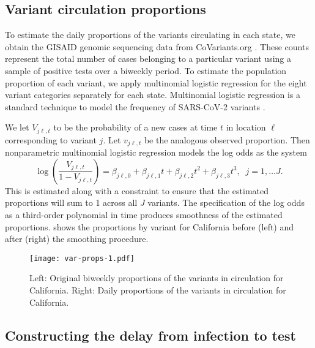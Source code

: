 \subsection{Variant circulation proportions}
\label{sec:variant-proportions}


To estimate the daily proportions of the variants circulating in each state, we
obtain the GISAID genomic sequencing data from CoVariants.org
\citep{hodcroft2021covariants, elbe2017data}. These counts represent the total
number of cases belonging to a particular variant using
a sample of positive tests over a biweekly period. To estimate the population
proportion of each variant, we apply multinomial logistic regression 
for the eight variant categories separately for each state. 
Multinomial logistic regression is a standard technique to model the
frequency of SARS-CoV-2 variants 
\citep{obermeyer2022analysis, annavajhala2021emergence, figgins2021sars}.

We let $V_{j\ell,t}$ to be the probability of a new cases at time $t$ in location
$\ell$ corresponding to variant $j$. Let $v_{j\ell,t}$ be the analogous observed
proportion. Then nonparametric multinomial logistic regression models the log odds
as the system
\begin{equation}
\log\left(\frac{V_{j\ell,t}}{1-V_{j\ell,t}}\right) = \beta_{j\ell,0} + \beta_{j\ell,1} t + \beta_{j\ell,2}t^2 + \beta_{j\ell,3}t^3,\;\; j=1,\ldots J.
\end{equation}
This is estimated along with a constraint to ensure that the estimated proportions will sum to 1 across all
$J$ variants. The specification of the log odds as a third-order polynomial in
time produces smoothness of the estimated proportions.
  shows the proportions by variant for California before
(left) and after (right) the smoothing procedure. 

\begin{figure}[!tb]
    \centering
        \texttt{[image: var-props-1.pdf]}
        \caption{Left: Original biweekly proportions of the variants in circulation
        for California. Right: Daily proportions of the variants in circulation for
        California.}
        \label{fig:prop_figs}
    \end{figure}


    


\subsection{Constructing the delay from infection to test}
\label{supp:delay-sops}

